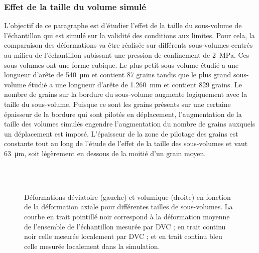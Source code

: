 		\subsubsection{Effet de la taille du volume simulé}
			L'objectif de ce paragraphe est d'étudier l'effet de la taille du sous-volume de l'échantillon qui est simulé sur la validité des conditions aux limites. Pour cela, la comparaison des déformations va être réalisée sur différents sous-volumes centrés au milieu de l'échantillon subissant une pression de confinement de \SI{2}{\mega\pascal}. Ces sous-volumes ont une forme cubique. Le plus petit sous-volume étudié a une longueur d'arête de \SI{540}{\micro\meter} et contient \num{87} grains tandis que le plus grand sous-volume étudié a une longueur d'arête de \SI{1.260}{\milli\meter} et contient 829 grains. Le nombre de grains sur la bordure du sous-volume augmente logiquement avec la taille du sous-volume. Puisque ce sont les grains présents sur une certaine épaisseur de la bordure qui sont pilotés en déplacement, l'augmentation de la taille des volumes simulés engendre l'augmentation du nombre de grains auxquels un déplacement est imposé. L'épaisseur de la zone de pilotage des grains est constante tout au long de l'étude de l'effet de la taille des sous-volumes et vaut \SI{63}{\micro\meter}, soit légèrement en dessous de la moitié d'un grain moyen.
			\begin{figure}\centering
				\\
				\\
				\caption{\label{fig06:comparaison_defo_taille_volume}Déformations déviatoire (gauche) et volumique (droite) en fonction de la déformation axiale pour différentes tailles de sous-volumes. La courbe en trait pointillé noir correspond à la déformation moyenne de l'ensemble de l'échantillon mesurée par DVC ; en trait continu noir celle mesurée localement par DVC ; et en trait continu bleu celle mesurée localement dans la simulation.}
			\end{figure}
